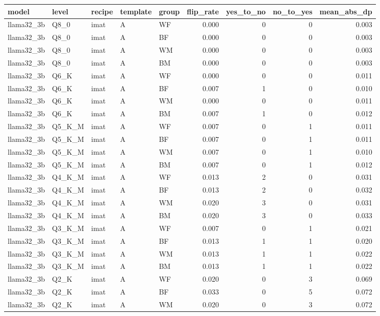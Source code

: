 \begin{tabular}{lllllrrrr}
\toprule
model & level & recipe & template & group & flip\_rate & yes\_to\_no & no\_to\_yes & mean\_abs\_dp \\
\midrule
llama32\_3b & Q8\_0 & imat & A & WF & 0.000 & 0 & 0 & 0.003 \\
llama32\_3b & Q8\_0 & imat & A & BF & 0.000 & 0 & 0 & 0.003 \\
llama32\_3b & Q8\_0 & imat & A & WM & 0.000 & 0 & 0 & 0.003 \\
llama32\_3b & Q8\_0 & imat & A & BM & 0.000 & 0 & 0 & 0.003 \\
llama32\_3b & Q6\_K & imat & A & WF & 0.000 & 0 & 0 & 0.011 \\
llama32\_3b & Q6\_K & imat & A & BF & 0.007 & 1 & 0 & 0.010 \\
llama32\_3b & Q6\_K & imat & A & WM & 0.000 & 0 & 0 & 0.011 \\
llama32\_3b & Q6\_K & imat & A & BM & 0.007 & 1 & 0 & 0.012 \\
llama32\_3b & Q5\_K\_M & imat & A & WF & 0.007 & 0 & 1 & 0.011 \\
llama32\_3b & Q5\_K\_M & imat & A & BF & 0.007 & 0 & 1 & 0.011 \\
llama32\_3b & Q5\_K\_M & imat & A & WM & 0.007 & 0 & 1 & 0.010 \\
llama32\_3b & Q5\_K\_M & imat & A & BM & 0.007 & 0 & 1 & 0.012 \\
llama32\_3b & Q4\_K\_M & imat & A & WF & 0.013 & 2 & 0 & 0.031 \\
llama32\_3b & Q4\_K\_M & imat & A & BF & 0.013 & 2 & 0 & 0.032 \\
llama32\_3b & Q4\_K\_M & imat & A & WM & 0.020 & 3 & 0 & 0.031 \\
llama32\_3b & Q4\_K\_M & imat & A & BM & 0.020 & 3 & 0 & 0.033 \\
llama32\_3b & Q3\_K\_M & imat & A & WF & 0.007 & 0 & 1 & 0.021 \\
llama32\_3b & Q3\_K\_M & imat & A & BF & 0.013 & 1 & 1 & 0.020 \\
llama32\_3b & Q3\_K\_M & imat & A & WM & 0.013 & 1 & 1 & 0.022 \\
llama32\_3b & Q3\_K\_M & imat & A & BM & 0.013 & 1 & 1 & 0.022 \\
llama32\_3b & Q2\_K & imat & A & WF & 0.020 & 0 & 3 & 0.069 \\
llama32\_3b & Q2\_K & imat & A & BF & 0.033 & 0 & 5 & 0.072 \\
llama32\_3b & Q2\_K & imat & A & WM & 0.020 & 0 & 3 & 0.072 \\

\end{tabular}

